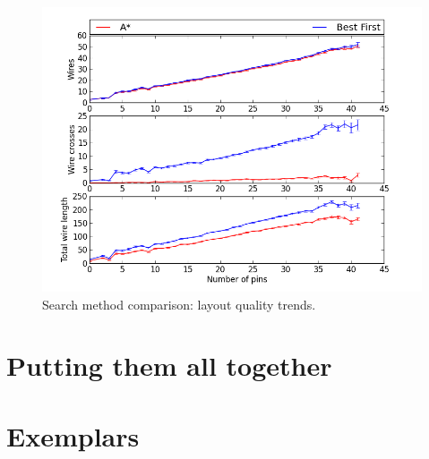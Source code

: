 \begin{figure}
\begin{center}
\includegraphics[width=\textwidth]{Images/search_quality_trend_comparison.png}
\caption{Search method comparison: layout quality trends.}
\label{fig:search_quality_trend}
\end{center}
\end{figure}

\section{Putting them all together}

\section{Exemplars}

